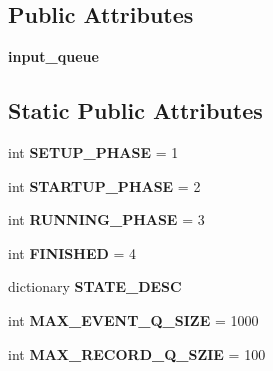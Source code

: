\subsection*{Public Attributes}
\begin{DoxyCompactItemize}
\item 
\hypertarget{classetl_1_1EtlProcessorBase_1_1EtlProcessorBase_a734c7d87d4efa8c235c216f7455f8044}{{\bfseries input\-\_\-queue}}\label{classetl_1_1EtlProcessorBase_1_1EtlProcessorBase_a734c7d87d4efa8c235c216f7455f8044}

\end{DoxyCompactItemize}
\subsection*{Static Public Attributes}
\begin{DoxyCompactItemize}
\item 
\hypertarget{classetl_1_1EtlProcessorBase_1_1EtlProcessorBase_ada4a767f0298a8036738f8be0a1e1c0f}{int {\bfseries S\-E\-T\-U\-P\-\_\-\-P\-H\-A\-S\-E} = 1}\label{classetl_1_1EtlProcessorBase_1_1EtlProcessorBase_ada4a767f0298a8036738f8be0a1e1c0f}

\item 
\hypertarget{classetl_1_1EtlProcessorBase_1_1EtlProcessorBase_a0d098520d6441ba28382092d79632ed1}{int {\bfseries S\-T\-A\-R\-T\-U\-P\-\_\-\-P\-H\-A\-S\-E} = 2}\label{classetl_1_1EtlProcessorBase_1_1EtlProcessorBase_a0d098520d6441ba28382092d79632ed1}

\item 
\hypertarget{classetl_1_1EtlProcessorBase_1_1EtlProcessorBase_abaa2ad4994bcc4214b9017900f1ff7f2}{int {\bfseries R\-U\-N\-N\-I\-N\-G\-\_\-\-P\-H\-A\-S\-E} = 3}\label{classetl_1_1EtlProcessorBase_1_1EtlProcessorBase_abaa2ad4994bcc4214b9017900f1ff7f2}

\item 
\hypertarget{classetl_1_1EtlProcessorBase_1_1EtlProcessorBase_a0439d55a6b6789992f3004fe377f0006}{int {\bfseries F\-I\-N\-I\-S\-H\-E\-D} = 4}\label{classetl_1_1EtlProcessorBase_1_1EtlProcessorBase_a0439d55a6b6789992f3004fe377f0006}

\item 
dictionary {\bfseries S\-T\-A\-T\-E\-\_\-\-D\-E\-S\-C}
\item 
\hypertarget{classetl_1_1EtlProcessorBase_1_1EtlProcessorBase_af8e5e9872734886bfef3db710f683885}{int {\bfseries M\-A\-X\-\_\-\-E\-V\-E\-N\-T\-\_\-\-Q\-\_\-\-S\-I\-Z\-E} = 1000}\label{classetl_1_1EtlProcessorBase_1_1EtlProcessorBase_af8e5e9872734886bfef3db710f683885}

\item 
\hypertarget{classetl_1_1EtlProcessorBase_1_1EtlProcessorBase_a40c5025f0561e5c67a98c9101ec7a9d8}{int {\bfseries M\-A\-X\-\_\-\-R\-E\-C\-O\-R\-D\-\_\-\-Q\-\_\-\-S\-Z\-I\-E} = 100}\label{classetl_1_1EtlProcessorBase_1_1EtlProcessorBase_a40c5025f0561e5c67a98c9101ec7a9d8}

\end{DoxyCompactItemize}


